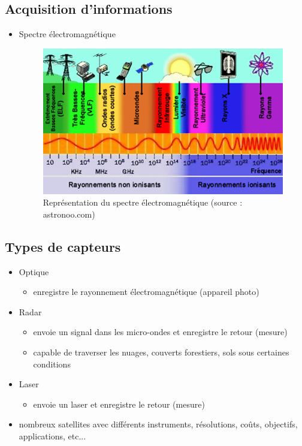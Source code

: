 \documentclass[11pt]{beamer}
\begin{document}
\subsection{Acquisition d'informations}
\begin{frame}{}
\begin{itemize}
\item Spectre électromagnétique
\begin{figure}[!h]
\includegraphics[scale=0.40]{img/spectre-electromagnetique.png}
\caption{Représentation du spectre électromagnétique (source : astronoo.com)}
\label{spectreElectro}
\end{figure}
\end{itemize}
\end{frame}

\subsection{Types de capteurs}
\begin{frame}{}
\begin{itemize}
\item Optique
\begin{itemize}
\item enregistre le rayonnement électromagnétique (appareil photo)
\end{itemize} 
\item Radar
\begin{itemize}
\item envoie un signal dans les micro-ondes et enregistre le retour (mesure)
\item capable de traverser les nuages, couverts forestiers, sols sous certaines conditions
\end{itemize} 
\item Laser
\begin{itemize}
\item envoie un laser et enregistre le retour (mesure)
\end{itemize} 
\item nombreux satellites avec différents instruments, résolutions, coûts, objectifs, applications, etc...
\end{itemize}
\end{frame}
\end{document}
